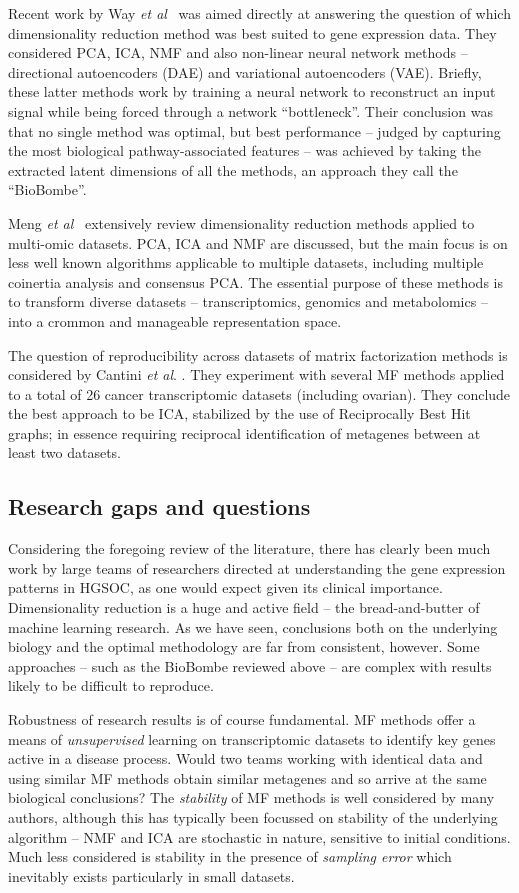 \documentclass[tikz, 12pt,a4paper,oneside,fleqn]{article}
\newcommand{\etal}{{\em et al\/}}
\begin{document}
Recent work by Way \etal\ \cite{WayGregory2019} was aimed directly at answering the question of which dimensionality reduction method was best suited to gene expression data.  They considered PCA, ICA, NMF and also non-linear neural network methods -- directional autoencoders (DAE)  and variational autoencoders (VAE).  Briefly, these latter methods work by training a neural network to reconstruct an input signal while being forced through a network ``bottleneck''.   Their conclusion was that no single method was optimal, but best performance -- judged by capturing the most biological pathway-associated features -- was achieved by taking the extracted latent dimensions of all the methods, an approach they call the ``BioBombe''.

Meng \etal\ \cite{Meng2016} extensively review dimensionality reduction methods applied to multi-omic datasets.   PCA, ICA and NMF are discussed, but the main focus is on less well known algorithms applicable to multiple datasets, including multiple coinertia analysis and consensus PCA.  The essential purpose of these methods is to transform diverse datasets -- transcriptomics, genomics and metabolomics  -- into a crommon and manageable representation space.

The question of reproducibility across datasets of matrix factorization methods is considered by Cantini \etal. \cite{Cantini2019}.  They experiment with several MF methods applied to a total of 26 cancer transcriptomic datasets (including ovarian).  They conclude the best approach to be ICA, stabilized by the use of Reciprocally Best Hit graphs; in essence requiring reciprocal identification of metagenes between at least two datasets.

\subsection{Research gaps and questions}
Considering the foregoing review of the literature, there has clearly been much work by large teams of researchers directed at understanding the gene expression patterns in HGSOC, as one would expect given its clinical importance.  
Dimensionality reduction is a huge and active field -- the bread-and-butter of machine learning research. 
As we have seen, conclusions both on the underlying biology and the optimal methodology are far from consistent, however.   Some approaches -- such as the BioBombe reviewed above -- are complex with results likely to be difficult to reproduce.   

Robustness of research results is of course fundamental.  MF methods offer a means of \emph{unsupervised} learning on transcriptomic datasets to identify key genes active in a disease process.  Would two teams working with identical data and using similar MF methods obtain similar metagenes and so arrive at the same biological conclusions?   The \emph{stability} of MF methods is well considered by many authors, although this has typically been focussed on stability of the underlying algorithm -- NMF and ICA are stochastic in nature, sensitive to initial conditions.   Much less considered is stability in the presence of \emph{sampling error} which inevitably exists particularly in small datasets.
\end{document}
